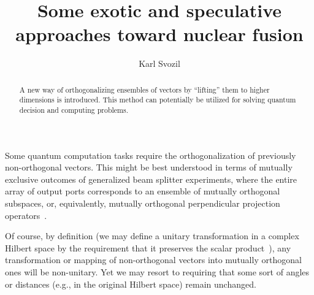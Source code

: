 \documentclass[%
 preprint,
 showpacs,
 showkeys,
 preprintnumbers,
 amsmath,amssymb,
 aps,
  pra,
  longbibliography,
 ]{revtex4-1}
\begin{document}
\title{Some exotic and speculative approaches toward nuclear fusion}



\author{Karl Svozil}
 



\begin{abstract}
A new way of orthogonalizing ensembles of vectors by ``lifting'' them to higher dimensions is introduced. This method can potentially be utilized for solving quantum decision and computing problems.
\end{abstract}

\maketitle


Some quantum computation tasks require the ortho\-gonalization of
previously non-orthogonal vectors. This might be best understood in terms of
mutually exclusive outcomes of generalized beam splitter experiments, where the
entire array of output ports corresponds to an ensemble of mutually orthogonal
subspaces, or, equivalently, mutually orthogonal perpendicular projection
operators~\cite{svozil-2016-vector}.

Of course, by definition (we may define a unitary transformation in a complex
Hilbert space by the requirement that it preserves the scalar
product~\cite[\S~73]{halmos-vs}), any transformation or mapping of
non-orthogonal vectors into mutually orthogonal ones will be non-unitary.
Yet we may resort to requiring
that some sort of angles or distances (e.g., in the original Hilbert space)
remain unchanged.

\end{document}
